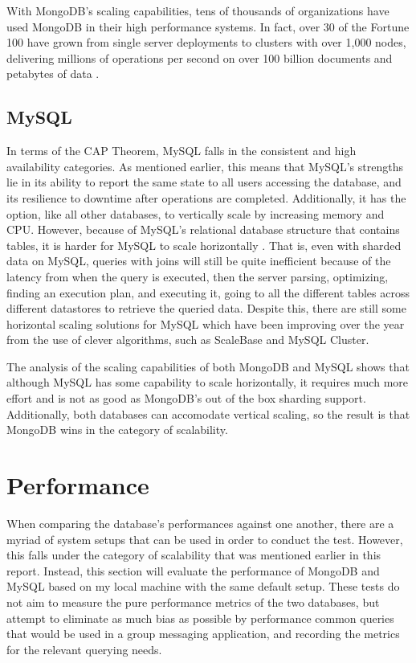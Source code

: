 \documentclass[12pt]{article}
\begin{document}
With MongoDB's scaling capabilities, tens of thousands of organizations have used MongoDB in their high performance systems. In fact, over 30 of the Fortune 100 have grown from single server deployments to clusters with over 1,000 nodes, delivering millions of operations per second on over 100 billion documents and petabytes of data \cite{mongodb_scale}.

\subsection{MySQL}

In terms of the CAP Theorem, MySQL falls in the consistent and high availability categories. As mentioned earlier, this means that MySQL's strengths lie in its ability to report the same state to all users accessing the database, and its resilience to downtime after operations are completed. Additionally, it has the option, like all other databases, to vertically scale by increasing memory and CPU. However, because of MySQL's relational database structure that contains tables, it is harder for MySQL to scale horizontally \cite{mysql_scale_issues}. That is, even with sharded data on MySQL, queries with joins will still be quite inefficient because of the latency from when the query is executed, then the server parsing, optimizing, finding an execution plan, and executing it, going to all the different tables across different datastores to retrieve the queried data. Despite this, there are still some horizontal scaling solutions for MySQL which have been improving over the year from the use of clever algorithms, such as ScaleBase and MySQL Cluster.

The analysis of the scaling capabilities of both MongoDB and MySQL shows that although MySQL has some capability to scale horizontally, it requires much more effort and is not as good as MongoDB's out of the box sharding support. Additionally, both databases can accomodate vertical scaling, so the result is that MongoDB wins in the category of scalability.


\section{Performance}

When comparing the database's performances against one another, there are a myriad of system setups that can be used in order to conduct the test. However, this falls under the category of scalability that was mentioned earlier in this report. Instead, this section will evaluate the performance of MongoDB and MySQL based on my local machine with the same default setup. These tests do not aim to measure the pure performance metrics of the two databases, but attempt to eliminate as much bias as possible by performance common queries that would be used in a group messaging application, and recording the metrics for the relevant querying needs. 
\end{document}
